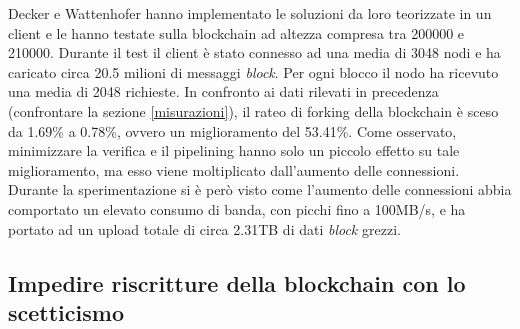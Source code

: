 Decker e Wattenhofer hanno implementato le soluzioni da loro teorizzate in un client e le hanno testate sulla blockchain ad altezza compresa tra 200000 e 210000. Durante il test il client è stato connesso ad una media di 3048 nodi e ha caricato circa 20.5 milioni di messaggi \emph{block}. Per ogni blocco il nodo ha ricevuto una media di 2048 richieste.
In confronto ai dati rilevati in precedenza (confrontare la sezione \ref{misurazioni}), il rateo di forking della blockchain è sceso da 1.69\% a 0.78\%, ovvero un miglioramento del 53.41\%. Come osservato, minimizzare la verifica e il pipelining hanno solo un piccolo effetto su tale miglioramento, ma esso viene moltiplicato dall'aumento delle connessioni. Durante la sperimentazione si è però visto come l'aumento delle connessioni abbia comportato un elevato consumo di banda, con picchi fino a 100MB/s, e ha portato ad un upload totale di circa 2.31TB di dati \emph{block} grezzi.

\subsection{Impedire riscritture della blockchain con lo scetticismo}


